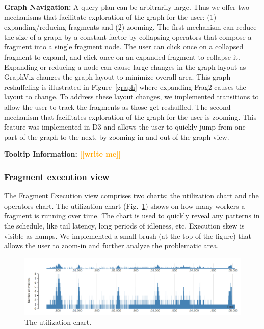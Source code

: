 \documentclass{chi2009}
\newcommand*{\fragment}{Fragment Execution\xspace}
\newcommand{\todo}[1]{\textsf{\textbf{\textcolor{Orange}{[[#1]]}}}}
\begin{document}
\textbf{Graph Navigation:} A query plan can be arbitrarily large. Thus we offer two mechanisms that facilitate exploration of the graph for the user: (1) expanding/reducing fragments and (2) zooming. The first mechanism can reduce the size of a graph by a constant factor by collapsing operators that compose a fragment into a single fragment node. The user can click once on a collapsed fragment to expand, and click once on an expanded fragment to collapse it. Expanding or reducing a node can cause large changes in the graph layout as GraphViz changes the graph layout to minimize overall area. This graph reshuffeling is illustrated in Figure~\ref{graph} where expanding Frag2 causes the layout to change. To address these layout changes, we implemented transitions to allow the user to track the fragments as those get reshuffled. The second mechanism that facilitates exploration of the graph for the user is zooming. This feature was implemented in D3 and allows the user to quickly jump from one part of the graph to the next, by zooming in and out of the graph view.

\textbf{Tooltip Information:} \todo{write me}


\subsubsection{Fragment execution view}
\label{sec:fragment}


The \fragment view comprises two charts: the utilization chart and the
operators chart. The utilization chart (Fig.~\ref{fig:utilization_chart}) shows on
how many workers a fragment is running over time. The chart is used to
quickly reveal any patterns in the schedule, like tail latency, long periods of
idleness, etc. Execution skew is visible as humps.
We implemented a small brush (at the top of the figure) that
allows the user to zoom-in and further analyze the problematic area.

\begin{figure}[ht]
  \includegraphics[width=\columnwidth]{images/utilization_chart}
  \caption{The utilization chart. }
  \label{fig:utilization_chart}
\end{figure}
\end{document}
